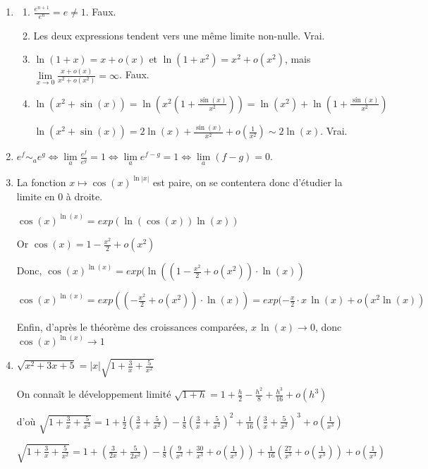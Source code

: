 \documentclass[]{article}
\begin{document}
\begin{enumerate}
\item
\begin{enumerate}
	\item $\frac{e^{n+1}}{e^n}=e \ne 1$. Faux.
	\item Les deux expressions tendent vers une même limite non-nulle. Vrai.
	\item $\ln(1+x) = x + o(x)$ et $\ln(1+x^2)=x^2+o(x^2)$, mais $\displaystyle \lim\limits_{x \to 0} \frac{x+o(x)}{x^2+o(x^2)}= \infty$. Faux.
	\item $\ln(x^2+\sin(x))=\ln\left(x^2\left(1+\frac{\sin(x)}{x^2}\right)\right)=\ln(x^2)+\ln\left(1+\frac{\sin(x)}{x^2}\right)$
	
	$\ln(x^2+\sin(x))=2\ln(x)+\frac{\sin(x)}{x^2}+o\left(\frac{1}{x^2}\right) \sim 2\ln(x)$. Vrai.
\end{enumerate}

\item $e^f \sim_a e^g \Leftrightarrow \lim\limits_{a} \frac{e^f}{e^g} = 1 \Leftrightarrow \lim\limits_{a} e^{f-g} = 1 \Leftrightarrow \lim\limits_{a}(f-g)=0$.

\item La fonction $x \longmapsto \cos(x)^{\ln |x|}$ est paire, on se contentera donc d'étudier la limite en $0$ à droite.

$\cos(x)^{\ln (x)}=exp(\ln(\cos(x)) \ln(x))$

Or $\cos(x) = 1 - \frac{x^2}{2}+ o(x^2)$

Donc, $\cos(x)^{\ln(x)} = exp(\ln((1 - \frac{x^2}{2} + o(x^2)) \cdot \ln(x))$

$\cos(x)^{\ln(x)} = exp((-\frac{x^2}{2}+o(x^2)) \cdot \ln(x))=exp(-\frac{x}{2} \cdot x \, \ln(x) + o(x^2\ln(x))$

Enfin, d'après le théorème des croissances comparées, $x \, \ln(x) \to 0$, donc $\cos(x)^{\ln(x)} \to 1$

\item $\sqrt{x^2+3x+5}=|x|\sqrt{1+\frac{3}{x}+\frac{5}{x^2}}$

On connaît le développement limité $\sqrt{1+h}=1+\frac{h}{2}-\frac{h^2}{8}+\frac{h^3}{16} + o(h^3)$

d'où $\sqrt{1+\frac{3}{x}+\frac{5}{x^2}} = 1+\frac{1}{2}(\frac{3}{x}+\frac{5}{x^2})-\frac{1}{8}(\frac{3}{x}+\frac{5}{x^2})^2+\frac{1}{16}(\frac{3}{x}+\frac{5}{x^2})^3 + o(\frac{1}{x^3})$

$\sqrt{1+\frac{3}{x}+\frac{5}{x^2}} = 1+(\frac{3}{2x}+\frac{5}{2x^2})-\frac{1}{8}(\frac{9}{x^2}+\frac{30}{x^3}+o(\frac{1}{x^3}))+\frac{1}{16}(\frac{27}{x^3}+o(\frac{1}{x^3})) + o(\frac{1}{x^3})$


\end{enumerate}
\end{document}
